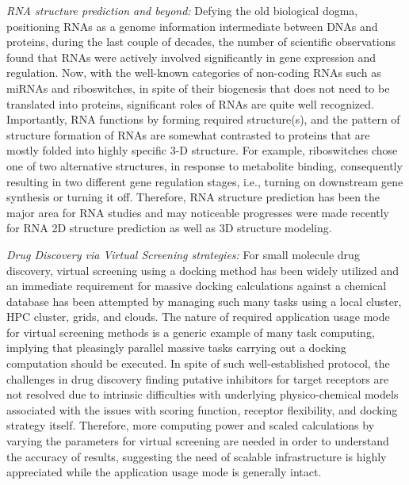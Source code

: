\documentclass{sig-alternate}
\begin{document}
\textit{RNA structure prediction and beyond:} Defying the old
biological dogma, positioning RNAs as a genome information
intermediate between DNAs and proteins, during the last couple of
decades, the number of scientific observations found that RNAs were
actively involved significantly in gene expression and
regulation\cite{joyce1999,cruz2009,encode2007,amaral2008}.  Now, with
the well-known categories of non-coding RNAs such as miRNAs and
riboswitches, in spite of their biogenesis that does not need to be
translated into proteins, significant roles of RNAs are quite well
recognized\cite{costa2009,ellington2007,baek2008,blouin2009,henkin2009}.
Importantly, RNA functions by forming required structure(s), and the
pattern of structure formation of RNAs are somewhat contrasted to
proteins that are mostly folded into highly specific 3-D
structure\cite{roth2009}. For example, riboswitches chose one of two
alternative structures, in response to metabolite binding,
consequently resulting in two different gene regulation stages, i.e.,
turning on downstream gene synthesis or turning it
off\cite{montange2008,dambach2009,weinberg2007}.  Therefore, RNA
structure prediction has been the major area for RNA studies and may
noticeable progresses were made recently for RNA 2D structure
prediction as well as 3D structure
modeling\cite{shapiro2007,mathews2006,ding2003}.

\textit{Drug Discovery via Virtual Screening strategies:} For small
molecule drug discovery, virtual screening using a docking method has
been widely utilized and an immediate requirement for massive docking
calculations against a chemical database has been attempted by
managing such many tasks using a local cluster, HPC cluster, grids,
and clouds\cite{levesque2009,yim2010}.  The nature of required
application usage mode for virtual screening methods is a generic
example of many task computing, implying that pleasingly parallel
massive tasks carrying out a docking computation should be executed.
In spite of such well-established protocol, the challenges in drug
discovery finding putative inhibitors for target receptors are not
resolved due to intrinsic difficulties with underlying
physico-chemical models associated with the issues with scoring
function, receptor flexibility, and docking strategy
itself\cite{amaro2010}.  Therefore, more computing power and scaled
calculations by varying the parameters for virtual screening are
needed in order to understand the accuracy of results, suggesting the
need of scalable infrastructure is highly appreciated while the
application usage mode is generally intact.
\end{document}
